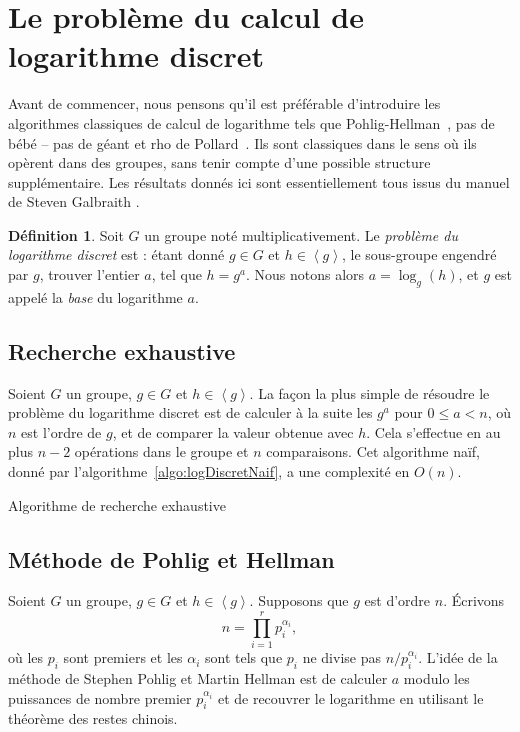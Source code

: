 \documentclass[a4paper, titlepage, 11pt]{article}
\theoremstyle{definition}
\newtheorem{defi}[theo]{Définition}
\theoremstyle{remark}
\def\O{O}
\def\gen #1{\left\langle#1\right\rangle}
\begin{document}
\section{Le problème du calcul de logarithme discret}\label{sec:DLPgroupe}

Avant de commencer, nous pensons qu'il est préférable d'introduire les algorithmes classiques de calcul de logarithme tels que Pohlig-Hellman~\cite{pohligHellman1978}, pas de bébé -- pas de géant et rho de Pollard~\cite{pollard1978}. Ils sont classiques dans le sens où ils opèrent dans des groupes, sans tenir compte d'une possible structure supplémentaire.
Les résultats donnés ici sont essentiellement tous issus du manuel de Steven Galbraith \cite[section 13 et 14, p. 246 à 297]{galbraith2012}.

\begin{defi}\label{defLogDiscret}
Soit $G$ un groupe noté multiplicativement. Le \textit{problème du logarithme discret} est : étant donné $g\in G$ et $h \in \gen{g}$, le sous-groupe engendré par $g$, trouver l'entier $a$, tel que $h=g^a$. Nous notons alors $a=\log_g(h)$, et $g$ est appelé la \textit{base} du logarithme $a$.\end{defi}

\subsection{Recherche exhaustive}

Soient $G$ un groupe, $g\in G$ et $h \in \gen{g}$. La façon la plus simple de résoudre le problème du logarithme discret est de calculer à la suite les $g^a$ pour $0 \leqslant a < n$, où $n$ est l'ordre de $g$, et de comparer la valeur obtenue avec $h$. Cela s'effectue en au plus $n - 2$ opérations dans le groupe et $n$ comparaisons. Cet algorithme naïf, donné par l'algorithme~\ref{algo:logDiscretNaif}, a une complexité en $\O(n)$.

\begin{algorithm}[h]
\caption{Algorithme de recherche exhaustive}
\label{algo:logDiscretNaif}
\begin{algorithmic}[1]
\REQUIRE{$g$ et $h \in \gen{g}$}
\ENDWHILE
{}
\end{algorithmic}
\end{algorithm}

\subsection{Méthode de Pohlig et Hellman}
\label{s-sec:pohligHellman}
Soient $G$ un groupe, $g\in G$ et $h \in \gen{g}$. Supposons que $g$ est d'ordre $n$. \'Ecrivons $$n = \prod_{i=1}^r p_i^{\alpha_i},$$
où les $p_i$ sont premiers et les $\alpha_i$ sont tels que $p_i$ ne divise pas $n/p_i^{\alpha_i}$.
L'idée de la méthode de Stephen Pohlig et Martin Hellman \cite{pohligHellman1978} est de calculer $a$ modulo les puissances de nombre premier $p_i^{\alpha_i}$ et de recouvrer le logarithme en utilisant le théorème des restes chinois.
\end{document}
